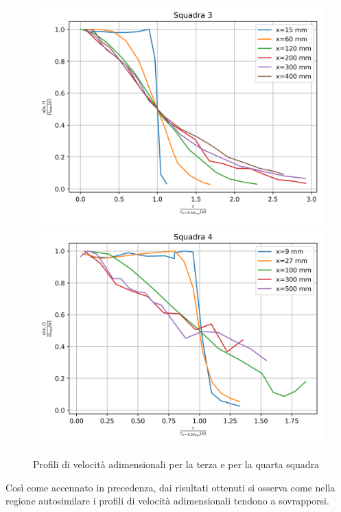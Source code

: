 \begin{figure}[H]
    \centering
    \includegraphics[width=.8\textwidth]{images/3/sq3umax.png}
    \includegraphics[width=.8\textwidth]{images/3/sq4umax.png}
    \caption{Profili di velocità adimensionali per la terza e per la quarta squadra}
\end{figure}

\noindent Così come accennato in precedenza, dai risultati ottenuti si osserva come nella regione autosimilare i profili di velocità adimensionali tendono a sovrapporsi.
